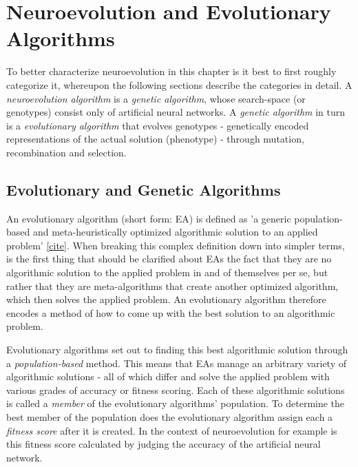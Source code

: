 \documentclass[journal, a4paper]{IEEEtran}
\begin{document}

\section{Neuroevolution and Evolutionary Algorithms}

To better characterize neuroevolution in this chapter is it best to first roughly categorize it, whereupon the following sections describe the categories in detail. A \textit{neuroevolution algorithm} is a \textit{genetic algorithm}, whose search-space (or genotypes) consist only of artificial neural networks. A \textit{genetic algorithm} in turn is a \textit{evolutionary algorithm} that evolves genotypes - genetically encoded representations of the actual solution (phenotype) - through mutation, recombination and selection.



\subsection{Evolutionary and Genetic Algorithms}

An evolutionary algorithm (short form: EA) is defined as 'a generic population-based and meta-heuristically optimized algorithmic solution to an applied problem' \href{https://en.wikipedia.org/wiki/Evolutionary_algorithm}{[cite]}. When breaking this complex definition down into simpler terms, is the first thing that should be clarified about EAs the fact that they are no algorithmic solution to the applied problem in and of themselves per se, but rather that they are meta-algorithms that create another optimized algorithm, which then solves the applied problem. An evolutionary algorithm therefore encodes a method of how to come up with the best solution to an algorithmic problem.

Evolutionary algorithms set out to finding this best algorithmic solution through a \textit{population-based} method. This means that EAs manage an arbitrary variety of algorithmic solutions - all of which differ and solve the applied problem with various grades of accuracy or fitness scoring. Each of these algorithmic solutions is called a \textit{member} of the evolutionary algorithms' population. To determine the best member of the population does the evolutionary algorithm assign each a \textit{fitness score} after it is created. In the context of neuroevolution for example is this fitness score calculated by judging the accuracy of the artificial neural network.
\end{document}
